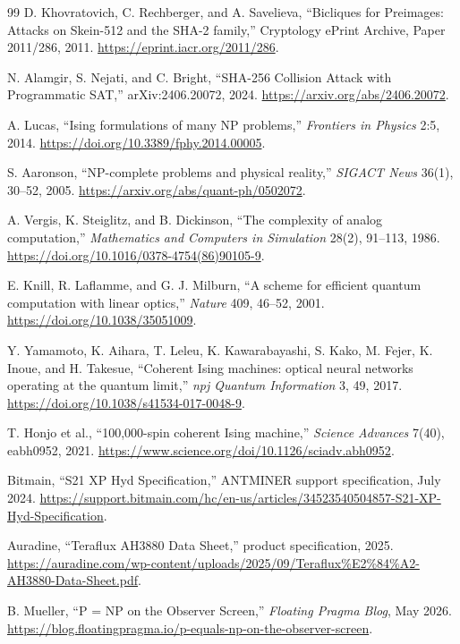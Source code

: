 \documentclass[11pt]{article}
\theoremstyle{definition}
\theoremstyle{remark}
\begin{document}
\begin{thebibliography}{99}
D. Khovratovich, C. Rechberger, and A. Savelieva,
``Bicliques for Preimages: Attacks on Skein-512 and the SHA-2 family,''
Cryptology ePrint Archive, Paper 2011/286, 2011.
\url{https://eprint.iacr.org/2011/286}.

N. Alamgir, S. Nejati, and C. Bright,
``SHA-256 Collision Attack with Programmatic SAT,''
arXiv:2406.20072, 2024. \url{https://arxiv.org/abs/2406.20072}.

A. Lucas,
``Ising formulations of many NP problems,''
\emph{Frontiers in Physics} 2:5, 2014.
\url{https://doi.org/10.3389/fphy.2014.00005}.

S. Aaronson,
``NP-complete problems and physical reality,''
\emph{SIGACT News} 36(1), 30--52, 2005.
\url{https://arxiv.org/abs/quant-ph/0502072}.

A. Vergis, K. Steiglitz, and B. Dickinson,
``The complexity of analog computation,''
\emph{Mathematics and Computers in Simulation} 28(2), 91--113, 1986.
\url{https://doi.org/10.1016/0378-4754(86)90105-9}.

E. Knill, R. Laflamme, and G. J. Milburn,
``A scheme for efficient quantum computation with linear optics,''
\emph{Nature} 409, 46--52, 2001.
\url{https://doi.org/10.1038/35051009}.

Y. Yamamoto, K. Aihara, T. Leleu, K. Kawarabayashi, S. Kako,
M. Fejer, K. Inoue, and H. Takesue,
``Coherent Ising machines: optical neural networks operating at the quantum
limit,'' \emph{npj Quantum Information} 3, 49, 2017.
\url{https://doi.org/10.1038/s41534-017-0048-9}.

T. Honjo et al.,
``100,000-spin coherent Ising machine,''
\emph{Science Advances} 7(40), eabh0952, 2021.
\url{https://www.science.org/doi/10.1126/sciadv.abh0952}.

Bitmain,
``S21 XP Hyd Specification,''
ANTMINER support specification, July 2024.
\url{https://support.bitmain.com/hc/en-us/articles/34523540504857-S21-XP-Hyd-Specification}.

Auradine,
``Teraflux AH3880 Data Sheet,''
product specification, 2025.
\url{https://auradine.com/wp-content/uploads/2025/09/Teraflux%E2%84%A2-AH3880-Data-Sheet.pdf}.

B. Mueller,
``P = NP on the Observer Screen,''
\emph{Floating Pragma Blog}, May 2026.
\url{https://blog.floatingpragma.io/p-equals-np-on-the-observer-screen}.


\end{thebibliography}
\end{document}
